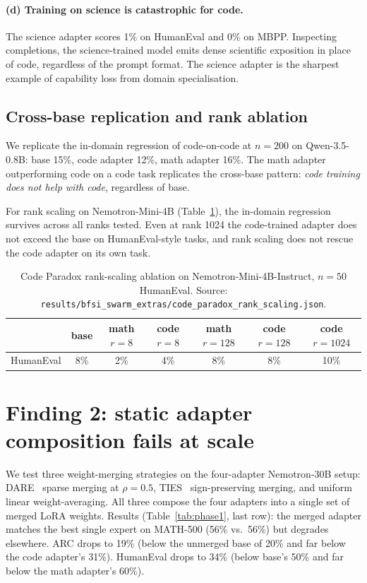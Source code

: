 \documentclass{article}
\begin{document}
\paragraph{(d) Training on science is catastrophic for code.} The science adapter scores 1\% on HumanEval and 0\% on MBPP. Inspecting completions, the science-trained model emits dense scientific exposition in place of code, regardless of the prompt format. The science adapter is the sharpest example of capability loss from domain specialisation.

\subsection{Cross-base replication and rank ablation}
\label{sec:rank}

We replicate the in-domain regression of code-on-code at $n=200$ on Qwen-3.5-0.8B: base 15\%, code adapter 12\%, math adapter 16\%. The math adapter outperforming code on a code task replicates the cross-base pattern: \emph{code training does not help with code}, regardless of base.

For rank scaling on Nemotron-Mini-4B (Table~\ref{tab:rank}), the in-domain regression survives across all ranks tested. Even at rank 1024 the code-trained adapter does not exceed the base on HumanEval-style tasks, and rank scaling does not rescue the code adapter on its own task.

\begin{table}[h]
  \caption{Code Paradox rank-scaling ablation on Nemotron-Mini-4B-Instruct, $n=50$ HumanEval. Source: \texttt{results/bfsi\_swarm\_extras/code\_paradox\_rank\_scaling.json}.}
  \label{tab:rank}
  \centering
  \begin{tabular}{lcccccc}
    \toprule
    & base & math $r{=}8$ & code $r{=}8$ & math $r{=}128$ & code $r{=}128$ & code $r{=}1024$ \\
    \midrule
    HumanEval & 8\% & 2\% & 4\% & 8\% & 8\% & 10\% \\
    \bottomrule
  \end{tabular}
\end{table}


\section{Finding 2: static adapter composition fails at scale}
\label{sec:static}

We test three weight-merging strategies on the four-adapter Nemotron-30B setup: DARE~\citep{yu2024dare} sparse merging at $\rho = 0.5$, TIES~\citep{yadav2023ties} sign-preserving merging, and uniform linear weight-averaging. All three compose the four adapters into a single set of merged LoRA weights. Results (Table~\ref{tab:phase1}, last row): the merged adapter matches the best single expert on MATH-500 (56\% vs.\ 56\%) but degrades elsewhere. ARC drops to 19\% (below the unmerged base of 20\% and far below the code adapter's 31\%). HumanEval drops to 34\% (below base's 50\% and far below the math adapter's 60\%).
\end{document}
